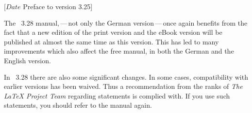 %
%
%
%
%
%
%
%
%

                 [$Date$
                  Preface to version 3.25]



The \KOMAScript~3.28 manual,\,---\,not only the German version\,---\,once
again benefits from the fact that a new edition of the print version
\cite{book:komascript} and the eBook version \cite{ebook:komascript} will be
published at almost the same time as this version. This has led to many
improvements which also affect the free manual, in both the German and the
English version.

In \KOMAScript~3.28 there are also some significant changes. In some cases,
compatibility with earlier versions has been waived. Thus a recommendation
from the ranks of \emph{The LaTeX Project Team} regarding 
statements is complied with. If you use such statements, you should refer to
the manual again.

